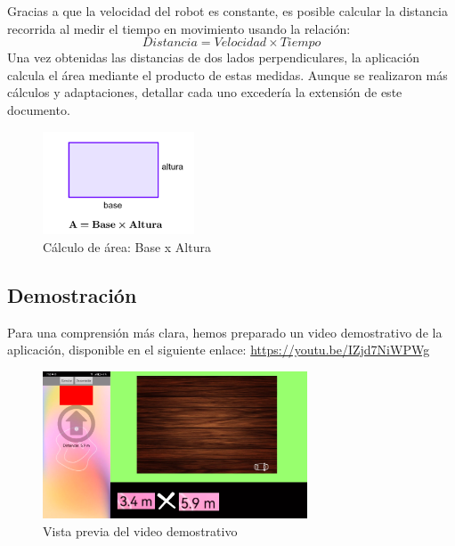 Gracias a que la velocidad del robot es constante, es posible calcular la distancia recorrida al medir el tiempo en movimiento usando la relación:
\[ Distancia = Velocidad \times Tiempo \]
Una vez obtenidas las distancias de dos lados perpendiculares, la aplicación calcula el área mediante el producto de estas medidas. Aunque se realizaron más cálculos y adaptaciones, detallar cada uno excedería la extensión de este documento.

\begin{figure}[H]
    \centering
    \includegraphics[width=0.4\textwidth]{Figures/0. General/base_altura.png}
    \caption{Cálculo de área: Base x Altura}
\end{figure}

\subsection{Demostración}
Para una comprensión más clara, hemos preparado un video demostrativo de la aplicación, disponible en el siguiente enlace: \url{https://youtu.be/IZjd7NiWPWg}

\begin{figure}[H]
    \centering
    \includegraphics[width=0.7\textwidth]{Figures/0. General/video.png}
    \caption{Vista previa del video demostrativo}
\end{figure}
